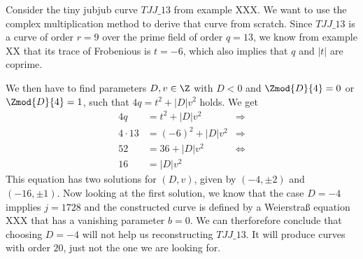 \begin{example} Consider the tiny jubjub curve $\mathit{TJJ\_13}$ from example XXX. We want to use the complex multiplication method to derive that curve from scratch. Since $\mathit{TJJ\_13}$ is a curve of order $r=9$ over the prime field of order $q=13$, we know from example XX that its trace of Frobenious is $t=-6$, which also implies that $q$ and $|t|$ are coprime. 

We then have to find parameters $D,v\in\Z$ with $D<0$ and $\Zmod{D}{4}=0$ or $\Zmod{D}{4}=1$, such that $4q = t^2+ |D|v^2$ holds. We get
\begin{align*}
4q & = t^2+ |D|v^2 & \Rightarrow \\
4\cdot 13 & = (-6)^2+ |D|v^2 & \Rightarrow \\
52 & = 36 + |D|v^2 & \Leftrightarrow \\
16 & = |D|v^2
\end{align*}
This equation has two solutions for $(D,v)$, given by $(-4,\pm 2)$ and $(-16,\pm 1)$. Now looking at the first solution, we know that the case $D=-4$ impplies $j=1728$ and the constructed curve is defined by a Weierstraß equation XXX that has a vanishing parameter $b=0$. We can therforefore conclude that choosing $D=-4$ will not help us reconstructing $\mathit{TJJ\_13}$. It will produce curves with order $20$, just not the one we are looking for.


\end{example}
